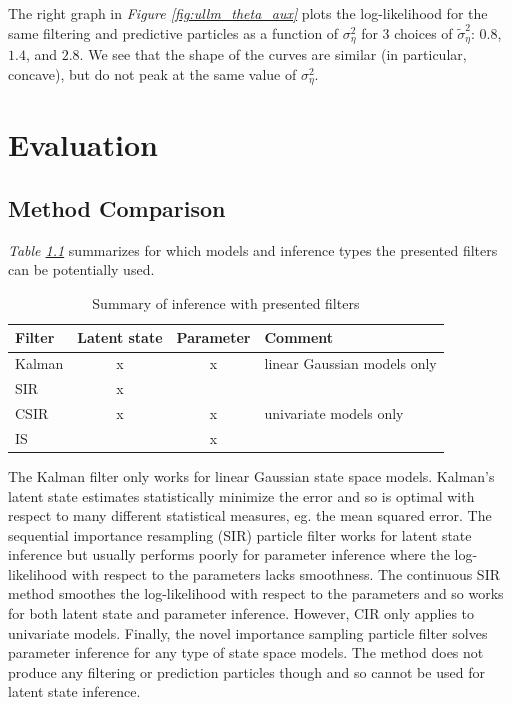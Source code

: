 \documentclass[11pt, oneside]{scrreprt}   	%
\begin{document}
The right graph in \textit{Figure \ref{fig:ullm_theta_aux}} plots the log-likelihood for the same filtering and predictive particles as a function of $\sigma_{\eta}^2$ for 3 choices of $\tilde{\sigma}_{\eta}^2$: $0.8$, $1.4$, and $2.8$. We see that the shape of the curves are similar (in particular, concave), but do not peak at the same value of $\sigma_{\eta}^2$. 

\chapter{Evaluation}
\label{chp:evaluation}

\section{Method Comparison}
\textit{Table \ref{tab:filter_summary}} summarizes for which models and inference types the presented filters can be potentially used. \\

\begin{table}[h!]
\centering
\begin{tabular}{lccl}
\hline
Filter  & Latent state & Parameter & Comment\\
\hline
Kalman    & x & x & linear Gaussian models only\\
SIR      & x & &\\
CSIR      & x & x & univariate models only\\
IS      & & x & \\
\hline
\end{tabular}
\caption{Summary of inference with presented filters}
\label{tab:filter_summary}
\end{table}

The Kalman filter only works for linear Gaussian state space models. Kalman's latent state estimates statistically minimize the error and so is optimal with respect to many different statistical measures, eg. the mean squared error.  The sequential importance resampling (SIR) particle filter works for latent state inference but usually performs poorly for parameter inference where the log-likelihood with respect to the parameters lacks smoothness. The continuous SIR method smoothes the log-likelihood with respect to the parameters and so works for both latent state and parameter inference. However, CIR only applies to univariate models. Finally, the novel importance sampling particle filter solves parameter inference for any type of state space models. The method does not produce any filtering or prediction particles though and so cannot be used for latent state inference. 
\end{document}
